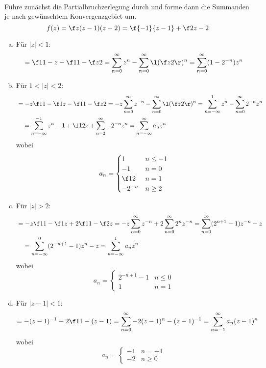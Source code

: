 \documentclass[a4paper]{scrartcl}
\begin{document}
	\setcounter{section}{6}

	\begin{aufgabe}~

		Führe zunächst die Partialbruchzerlegung durch und forme dann die Summanden je nach gewünschtem Konvergenzgebiet um.
		\[
			f(z)
			= \f z{(z-1)(z-2)}
			= \f {-1}{z-1} + \f 2{z-2}
		\]

		\begin{enumerate}[(a)]
			\item
				Für $|z|<1$:
				\[
					= \f 1{1-z} - \f 1{1-\f z2} 
					= \sum_{n=0}^\infty z^n - \sum_{n=0}^\infty \l(\f z2\r)^n
					= \sum_{n=0}^\infty (1-2^{-n}) z^n
				\]
			\item
				Für $1<|z|<2$:
				\begin{align*}
					&= -z \f 1{1-\f 1z} - \f 1{1-\f z2}
					= -z \sum_{n=0}^\infty z^{-n} - \sum_{n=0}^\infty \l(\f z2\r)^n 
					= \sum_{n=-\infty}^1 z^n - \sum_{n=0}^\infty 2^{-n} z^n \\
					&\quad = \sum_{n=-\infty}^{-1} z^n - 1 + \f 12 z + \sum_{n=2}^\infty -2^{-n} z^n
					= \sum_{n=-\infty}^\infty a_n z^n
				\end{align*}
				wobei
				\[
					a_n = \begin{cases}
						1 & n \le -1\\
						-1 & n = 0 \\
						\f 12 & n = 1 \\
						-2^{-n} & n \ge 2
					\end{cases}
				\]
			\item
				Für $|z|>2$:
				\begin{align*}
					&= -z \f 1{1-\f 1z} + 2 \f 1{1-\f 2z}
					= -z \sum_{n=0}^\infty z^{-n} + 2 \sum_{n=0}^\infty 2^n z^{-n}
					= \sum_{n=0}^\infty ( 2^{n+1} - 1) z^{-n} - z \\
					&\quad = \sum_{n=-\infty}^0 (2^{-n+1} -1) z^n - z
					= \sum_{n=-\infty}^1 a_n z^n
				\end{align*}
				wobei
				\[
					a_n = \begin{cases}
						2^{-n+1}-1 & n\le 0\\
						1 & n=1
					\end{cases}
				\]
			\item
				Für $|z-1|<1$:
				\begin{align*}
					= -(z-1)^{-1} - 2 \f 1{1-(z-1)}
					= \sum_{n=0}^\infty -2(z-1)^n - (z-1)^{-1}
					= \sum_{n=-1}^\infty a_n (z-1)^n
				\end{align*}
				wobei
				\[
					a_n = \begin{cases}
						-1 & n = -1 \\
						-2 & n \ge 0
					\end{cases}
				\]
		\end{enumerate}
	\end{aufgabe}
\end{document}
